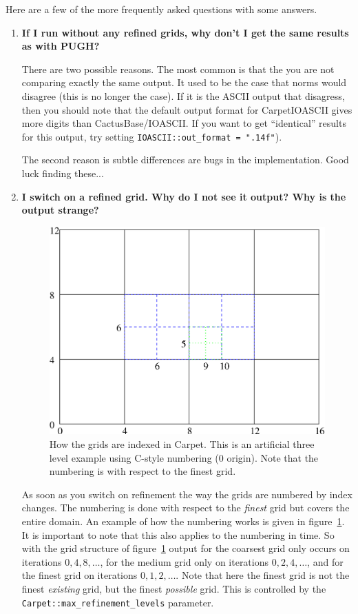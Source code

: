 Here are a few of the more frequently asked questions with some
answers.
\begin{enumerate}
\item \textbf{If I run without any refined grids, why don't I get the
    same results as with PUGH?}
  
  There are two possible reasons. The most common is that the you are
  not comparing exactly the same output. It used to be the case that
  norms would disagree (this is no longer the case). If it is the
  ASCII output that disagress, then you should note that the default
  output format for CarpetIOASCII gives more digits than
  CactusBase/IOASCII. If you want to get ``identical'' results for
  this output, try setting \texttt{IOASCII::out\_format = ".14f"}).

  The second reason is subtle differences are bugs in the
  implementation. Good luck finding these...
\item \textbf{I switch on a refined grid. Why do I not see it output?
    Why is the output strange?} 

\begin{figure}[htbp]
  \begin{center}
    \includegraphics[scale=0.5]{Grid1.eps}
    \caption{How the grids are indexed in Carpet. This is an
      artificial three level example using C-style numbering (0
      origin). Note that the numbering is with respect to the finest
      grid.}
    \label{fig:Grid1}
  \end{center}
\end{figure}
  As soon as you switch on refinement the way the grids are numbered
  by index changes. The numbering is done with respect to the
  \textit{finest} grid but covers the entire domain. An example of how
  the numbering works is given in figure~\ref{fig:Grid1}. It is
  important to note that this also applies to the numbering in
  time. So with the grid structure of figure~\ref{fig:Grid1} output
  for the coarsest grid only occurs on iterations $0,4,8,\dots$, for
  the medium grid only on iterations $0,2,4,\dots$, and for the finest
  grid on iterations $0,1,2,\dots$. Note that here the finest grid is
  not the finest \textit{existing} grid, but the finest
  \textit{possible} grid. This is controlled by the
  \texttt{Carpet::max\_refinement\_levels} parameter.


\end{enumerate}
